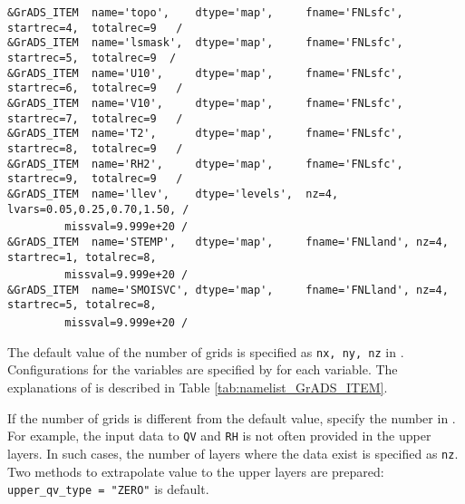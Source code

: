 {\verb|&GrADS_ITEM  name='topo',    dtype='map',     fname='FNLsfc', startrec=4,  totalrec=9   / |  \\
\verb|&GrADS_ITEM  name='lsmask',  dtype='map',     fname='FNLsfc', startrec=5,  totalrec=9  /  |  \\
\verb|&GrADS_ITEM  name='U10',     dtype='map',     fname='FNLsfc', startrec=6,  totalrec=9   / |  \\
\verb|&GrADS_ITEM  name='V10',     dtype='map',     fname='FNLsfc', startrec=7,  totalrec=9   / |  \\
\verb|&GrADS_ITEM  name='T2',      dtype='map',     fname='FNLsfc', startrec=8,  totalrec=9   / |  \\
\verb|&GrADS_ITEM  name='RH2',     dtype='map',     fname='FNLsfc', startrec=9,  totalrec=9   / |  \\
\verb|&GrADS_ITEM  name='llev',    dtype='levels',  nz=4, lvars=0.05,0.25,0.70,1.50, /        |  \\
~~~~~~~~\verb| missval=9.999e+20 /|  \\
\verb|&GrADS_ITEM  name='STEMP',   dtype='map',     fname='FNLland', nz=4, startrec=1, totalrec=8,|\\
~~~~~~~~\verb| missval=9.999e+20 /|  \\
\verb|&GrADS_ITEM  name='SMOISVC', dtype='map',     fname='FNLland', nz=4, startrec=5, totalrec=8,|\\
~~~~~~~~\verb| missval=9.999e+20 /|  \\
}

The default value of the number of grids is specified as \verb|nx, ny, nz| in .
Configurations for the variables are specified by  for each variable.
The explanations of  is described in Table \ref{tab:namelist_GrADS_ITEM}.


If the number of grids is different from the default value, specify the number in .
For example, the input data to \verb|QV| and \verb|RH| is not often provided in the upper layers.
In such cases, the number of layers where the data exist is specified as \verb|nz|.
Two methods to extrapolate value to the upper layers are prepared:
\verb| upper_qv_type = "ZERO"| is default.




